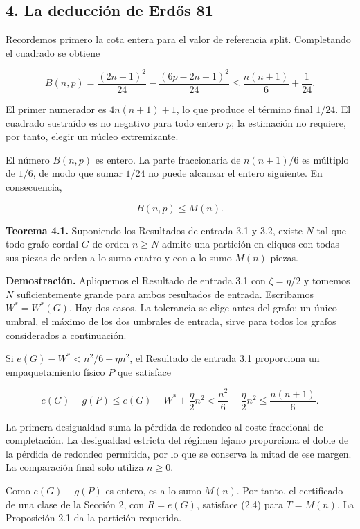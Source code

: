 \documentclass[spanish,11pt,a4paper]{article}
\begin{document}
\subsection{4. La deducción de Erdős
81}\label{la-deducciuxf3n-de-erdux151s-81}

Recordemos primero la cota entera para el valor de referencia split.
Completando el cuadrado se obtiene

\[
B(n,p)=\frac{(2n+1)^2}{24}
-\frac{(6p-2n-1)^2}{24}
\le\frac{n(n+1)}6+\frac1{24}.
\tag{4.1}
\]

El primer numerador es \(4n(n+1)+1\), lo que produce el término final
\(1/24\). El cuadrado sustraído es no negativo para todo entero \(p\);
la estimación no requiere, por tanto, elegir un núcleo extremizante.

El número \(B(n,p)\) es entero. La parte fraccionaria de \(n(n+1)/6\) es
múltiplo de \(1/6\), de modo que sumar \(1/24\) no puede alcanzar el
entero siguiente. En consecuencia,

\[
B(n,p)\le M(n).
\tag{4.2}
\]

\textbf{Teorema 4.1.} Suponiendo los Resultados de entrada 3.1 y 3.2,
existe \(N\) tal que todo grafo cordal \(G\) de orden \(n\ge N\) admite
una partición en cliques con todas sus piezas de orden a lo sumo cuatro
y con a lo sumo \(M(n)\) piezas.

\textbf{Demostración.} Apliquemos el Resultado de entrada 3.1 con
\(\zeta=\eta/2\) y tomemos \(N\) suficientemente grande para ambos
resultados de entrada. Escribamos \(W^*=W^*(G)\). Hay dos casos. La
tolerancia se elige antes del grafo: un único umbral, el máximo de los
dos umbrales de entrada, sirve para todos los grafos considerados a
continuación.

Si \(e(G)-W^*<n^2/6-\eta n^2\), el Resultado de entrada 3.1 proporciona
un empaquetamiento físico \(P\) que satisface

\[
e(G)-g(P)
\le e(G)-W^*+\frac\eta2n^2
<\frac{n^2}{6}-\frac\eta2n^2
\le\frac{n(n+1)}6.
\tag{4.3}
\]

La primera desigualdad suma la pérdida de redondeo al coste fraccional
de completación. La desigualdad estricta del régimen lejano proporciona
el doble de la pérdida de redondeo permitida, por lo que se conserva la
mitad de ese margen. La comparación final solo utiliza \(n\ge0\).

Como \(e(G)-g(P)\) es entero, es a lo sumo \(M(n)\). Por tanto, el
certificado de una clase de la Sección 2, con \(R=e(G)\), satisface
(2.4) para \(T=M(n)\). La Proposición 2.1 da la partición requerida.
\end{document}
